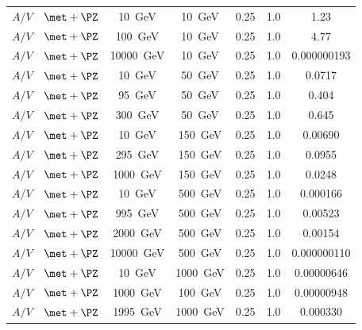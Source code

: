 \begin{table}[htb]
\begin{tabular}{ccccccc}
\(A/V\) & \(\met + \PZ\) & \SI{10}{\giga\electronvolt} & \SI{10}{\giga\electronvolt} & 0.25 & 1.0 & 1.23 \\
\(A/V\) & \(\met + \PZ\) & \SI{100}{\giga\electronvolt} & \SI{10}{\giga\electronvolt} & 0.25 & 1.0 & 4.77 \\
\(A/V\) & \(\met + \PZ\) & \SI{10000}{\giga\electronvolt} & \SI{10}{\giga\electronvolt} & 0.25 & 1.0 & 0.000000193 \\
\(A/V\) & \(\met + \PZ\) & \SI{10}{\giga\electronvolt} & \SI{50}{\giga\electronvolt} & 0.25 & 1.0 & 0.0717 \\
\(A/V\) & \(\met + \PZ\) & \SI{95}{\giga\electronvolt} & \SI{50}{\giga\electronvolt} & 0.25 & 1.0 & 0.404 \\
\(A/V\) & \(\met + \PZ\) & \SI{300}{\giga\electronvolt} & \SI{50}{\giga\electronvolt} & 0.25 & 1.0 & 0.645 \\
\(A/V\) & \(\met + \PZ\) & \SI{10}{\giga\electronvolt} & \SI{150}{\giga\electronvolt} & 0.25 & 1.0 & 0.00690 \\
\(A/V\) & \(\met + \PZ\) & \SI{295}{\giga\electronvolt} & \SI{150}{\giga\electronvolt} & 0.25 & 1.0 & 0.0955 \\
\(A/V\) & \(\met + \PZ\) & \SI{1000}{\giga\electronvolt} & \SI{150}{\giga\electronvolt} & 0.25 & 1.0 & 0.0248 \\
\(A/V\) & \(\met + \PZ\) & \SI{10}{\giga\electronvolt} & \SI{500}{\giga\electronvolt} & 0.25 & 1.0 & 0.000166 \\
\(A/V\) & \(\met + \PZ\) & \SI{995}{\giga\electronvolt} & \SI{500}{\giga\electronvolt} & 0.25 & 1.0 & 0.00523 \\
\(A/V\) & \(\met + \PZ\) & \SI{2000}{\giga\electronvolt} & \SI{500}{\giga\electronvolt} & 0.25 & 1.0 & 0.00154 \\
\(A/V\) & \(\met + \PZ\) & \SI{10000}{\giga\electronvolt} & \SI{500}{\giga\electronvolt} & 0.25 & 1.0 & 0.000000110 \\
\(A/V\) & \(\met + \PZ\) & \SI{10}{\giga\electronvolt} & \SI{1000}{\giga\electronvolt} & 0.25 & 1.0 & 0.00000646 \\
\(A/V\) & \(\met + \PZ\) & \SI{1000}{\giga\electronvolt} & \SI{100}{\giga\electronvolt} & 0.25 & 1.0 & 0.00000948 \\
\(A/V\) & \(\met + \PZ\) & \SI{1995}{\giga\electronvolt} & \SI{1000}{\giga\electronvolt} & 0.25 & 1.0 & 0.000330 \\
\bottomrule
\end{tabular}
\end{table}




